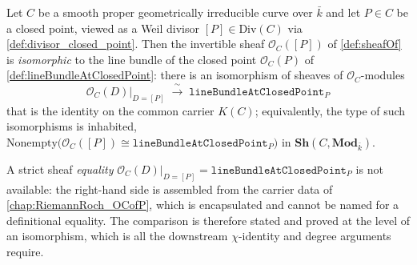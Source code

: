 \begin{lemma}

  \label{lem:sheafOf_singlePoint}

  Let \(C\) be a smooth proper geometrically irreducible curve over
  \(\bar k\) and let \(P \in C\) be a closed point, viewed as a Weil divisor
  \([P] \in \mathrm{Div}(C)\) via \cref{def:divisor_closed_point}. Then the
  invertible sheaf \(\mathcal O_C([P])\) of \cref{def:sheafOf} is
  \emph{isomorphic} to the line bundle of the closed point
  \(\mathcal O_C(P)\) of \cref{def:lineBundleAtClosedPoint}: there is an
  isomorphism of sheaves of \(\mathcal O_C\)-modules
  \[
    \mathcal O_C(D)\bigl|_{D = [P]}
    \;\xrightarrow{\ \sim\ }\;
    \texttt{lineBundleAtClosedPoint}_{P}
  \]
  that is the identity on the common carrier \(K(C)\); equivalently, the
  type of such isomorphisms is inhabited,
  \(\mathrm{Nonempty}\bigl(\mathcal O_C([P]) \cong
  \texttt{lineBundleAtClosedPoint}_P\bigr)\) in
  \(\mathbf{Sh}(C, \mathbf{Mod}_{\bar k})\).

  A strict sheaf \emph{equality}
  \(\mathcal O_C(D)|_{D=[P]} = \texttt{lineBundleAtClosedPoint}_P\) is not
  available: the right-hand side is assembled from the carrier data of
  \cref{chap:RiemannRoch_OCofP}, which is encapsulated and cannot be named
  for a definitional equality. The comparison is therefore stated and proved
  at the level of an isomorphism, which is all the downstream
  \(\chi\)-identity and degree arguments require.
\end{lemma}

